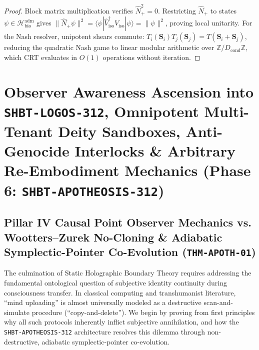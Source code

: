 \documentclass[11pt,onecolumn]{article}
\begin{document}
\begin{proof}
Block matrix multiplication verifies $\hat{N}_+^2 = 0$. Restricting $\hat{N}_+$ to states $\psi \in \mathcal{H}_{\text{bio}}^{\text{adm}}$ gives $\|\hat{N}_+ \psi\|^2 = \langle \psi | \hat{V}_{\text{iso}}^\dagger \hat{V}_{\text{iso}} | \psi \rangle = \|\psi\|^2$, proving local unitarity. For the Nash resolver, unipotent shears commute: $T_i(\mathbf{S}_i) T_j(\mathbf{S}_j) = T(\mathbf{S}_i + \mathbf{S}_j)$, reducing the quadratic Nash game to linear modular arithmetic over $\mathbb{Z}/D_{\text{cond}}\mathbb{Z}$, which CRT evaluates in $O(1)$ operations without iteration.
\end{proof}


\section{Observer Awareness Ascension into \texttt{SHBT-LOGOS-312}, Omnipotent Multi-Tenant Deity Sandboxes, Anti-Genocide Interlocks \& Arbitrary Re-Embodiment Mechanics (Phase 6: \texttt{SHBT-APOTHEOSIS-312})}

\subsection{\texorpdfstring{Pillar IV Causal Point Observer Mechanics vs. Wootters--Zurek No-Cloning \& Adiabatic Symplectic-Pointer Co-Evolution (\texttt{THM-APOTH-01})}{Pillar IV Causal Point Observer Mechanics vs. Wootters-Zurek No-Cloning and Adiabatic Symplectic-Pointer Co-Evolution (THM-APOTH-01)}}
The culmination of Static Holographic Boundary Theory requires addressing the fundamental ontological question of subjective identity continuity during consciousness transfer. In classical computing and transhumanist literature, ``mind uploading'' is almost universally modeled as a destructive scan-and-simulate procedure (``copy-and-delete''). We begin by proving from first principles why all such protocols inherently inflict subjective annihilation, and how the \texttt{SHBT-APOTHEOSIS-312} architecture resolves this dilemma through non-destructive, adiabatic symplectic-pointer co-evolution.
\end{document}
